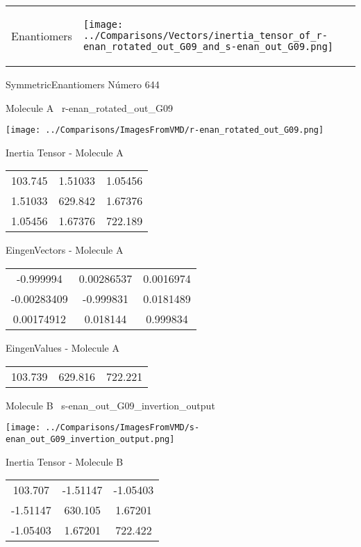 \vtab[-5mm]
\begin{tabular}{*{2}{m{}}}
\begin{center}
\textcolor{NavyBlue}{\Large Enantiomers}
\end{center}
&
\begin{center}
\texttt{[image: ../Comparisons/Vectors/inertia\_tensor\_of\_r-enan\_rotated\_out\_G09\_and\_s-enan\_out\_G09.png]}
\end{center}
\end{tabular}

 \newpage

\vtab[-3cm]
\begin{center}
{\large SymmetricEnantiomers \tab Número 644}
\end{center}
\begin{multicols}{2}
\begin{center}

Molecule A \
r-enan\_rotated\_out\_G09

\texttt{[image: ../Comparisons/ImagesFromVMD/r-enan\_rotated\_out\_G09.png]}

Inertia Tensor - Molecule A \\
\begin{tabular}{|c c c|}
103.745	 & 	1.51033	 & 	1.05456	 \\
1.51033	 & 	629.842	 & 	1.67376	 \\
1.05456	 & 	1.67376	 & 	722.189
\end{tabular}

\vtab
 EingenVectors - Molecule A     \\
\begin{tabular}{|c c c|}
-0.999994	 & 	0.00286537	 & 	0.0016974	 \\
-0.00283409	 & 	-0.999831	 & 	0.0181489	 \\
0.00174912	 & 	0.018144	 & 	0.999834
\end{tabular}

\vtab
 EingenValues - Molecule A     \\
\begin{tabular}{|c c c|}
103.739	 & 	629.816	 & 	722.221	 \\
\end{tabular}
\columnbreak

Molecule B \
s-enan\_out\_G09\_invertion\_output

\texttt{[image: ../Comparisons/ImagesFromVMD/s-enan\_out\_G09\_invertion\_output.png]}

Inertia Tensor - Molecule B \\
\begin{tabular}{|c c c|}
103.707	 & 	-1.51147	 & 	-1.05403	 \\
-1.51147	 & 	630.105	 & 	1.67201	 \\
-1.05403	 & 	1.67201	 & 	722.422
\end{tabular}


\end{center}
\end{multicols}
